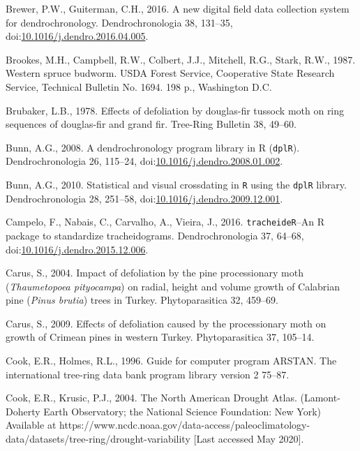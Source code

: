 \documentclass[review]{elsarticle} %
\begin{document}
\leavevmode\hypertarget{ref-Brewer2016}{}%
Brewer, P.W., Guiterman, C.H., 2016. A new digital field data collection system for dendrochronology. Dendrochronologia 38, 131--35, doi:\href{https://doi.org/10.1016/j.dendro.2016.04.005}{10.1016/j.dendro.2016.04.005}.

\leavevmode\hypertarget{ref-Brookes1987}{}%
Brookes, M.H., Campbell, R.W., Colbert, J.J., Mitchell, R.G., Stark, R.W., 1987. Western spruce budworm. USDA Forest Service, Cooperative State Research Service, Technical Bulletin No. 1694. 198 p., Washington D.C.

\leavevmode\hypertarget{ref-Brubaker1978}{}%
Brubaker, L.B., 1978. Effects of defoliation by douglas-fir tussock moth on ring sequences of douglas-fir and grand fir. Tree-Ring Bulletin 38, 49--60.

\leavevmode\hypertarget{ref-Bunn2008}{}%
Bunn, A.G., 2008. A dendrochronology program library in R (\texttt{dplR}). Dendrochronologia 26, 115--24, doi:\href{https://doi.org/10.1016/j.dendro.2008.01.002}{10.1016/j.dendro.2008.01.002}.

\leavevmode\hypertarget{ref-Bunn2010}{}%
Bunn, A.G., 2010. Statistical and visual crossdating in \texttt{R} using the \texttt{dplR} library. Dendrochronologia 28, 251--58, doi:\href{https://doi.org/10.1016/j.dendro.2009.12.001}{10.1016/j.dendro.2009.12.001}.

\leavevmode\hypertarget{ref-Campelo2016}{}%
Campelo, F., Nabais, C., Carvalho, A., Vieira, J., 2016. \texttt{tracheideR}--An R package to standardize tracheidograms. Dendrochronologia 37, 64--68, doi:\href{https://doi.org/10.1016/j.dendro.2015.12.006}{10.1016/j.dendro.2015.12.006}.

\leavevmode\hypertarget{ref-Carus2004}{}%
Carus, S., 2004. Impact of defoliation by the pine processionary moth (\emph{Thaumetopoea pityocampa}) on radial, height and volume growth of Calabrian pine (\emph{Pinus brutia}) trees in Turkey. Phytoparasitica 32, 459--69.

\leavevmode\hypertarget{ref-Carus2009}{}%
Carus, S., 2009. Effects of defoliation caused by the processionary moth on growth of Crimean pines in western Turkey. Phytoparasitica 37, 105--14.

\leavevmode\hypertarget{ref-arstan}{}%
Cook, E.R., Holmes, R.L., 1996. Guide for computer program ARSTAN. The international tree-ring data bank program library version 2 75--87.

\leavevmode\hypertarget{ref-Cook2004}{}%
Cook, E.R., Krusic, P.J., 2004. The North American Drought Atlas. (Lamont-Doherty Earth Observatory; the National Science Foundation: New York) Available at https://www.ncdc.noaa.gov/data-access/paleoclimatology-data/datasets/tree-ring/drought-variability {[}Last accessed May 2020{]}.
\end{document}

